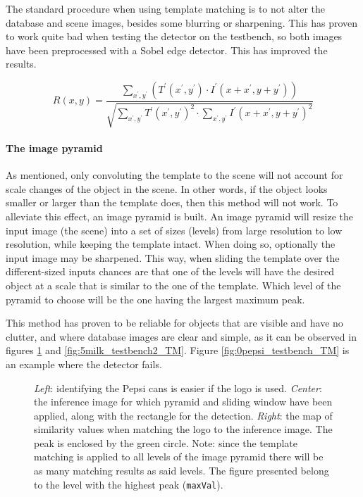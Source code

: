 \documentclass[../main.tex]{subfiles}
\begin{document}
The standard procedure when using template matching is to not alter the database and scene images, besides some blurring or sharpening. This has proven to work quite bad when testing the detector on the testbench, so both images have been preprocessed with a Sobel \cite{Sobel_operator_history} edge detector. This has improved the results.

\begin{equation} \label{eq:TM_CCOEFF_NORMED}
    R(x, y)=\frac{\sum_{x^{\prime}, y^{\prime}}\left(T^{\prime}\left(x^{\prime}, y^{\prime}\right) \cdot I^{\prime}\left(x+x^{\prime}, y+y^{\prime}\right)\right)}{\sqrt{\sum_{x^{\prime}, y^{\prime}} T^{\prime}\left(x^{\prime}, y^{\prime}\right)^{2} \cdot \sum_{x^{\prime}, y^{\prime}} I^{\prime}\left(x+x^{\prime}, y+y^{\prime}\right)^{2}}}
\end{equation}

\paragraph{The image pyramid}
As mentioned, only convoluting the template to the scene will not account for scale changes of the object in the scene. In other words, if the object looks smaller or larger than the template does, then this method will not work. To alleviate this effect, an image pyramid is built. An image pyramid will resize the input image (the scene) into a set of sizes (levels) from large resolution to low resolution, while keeping the template intact. When doing so, optionally the input image may be sharpened. This way, when sliding the template over the different-sized inputs chances are that one of the levels will have the desired object at a scale that is similar to the one of the template. Which level of the pyramid to choose will be the one having the largest maximum peak. 

This method has proven to be reliable for objects that are visible and have no clutter, and where database images are clear and simple, as it can be observed in figures \ref{fig:2pepsi_TM} and \ref{fig:5milk_testbench2_TM}. Figure \ref{fig:0pepsi_testbench_TM} is an example where the detector fails.


\begin{figure}[htbp]
    \centering
    \caption{\emph{Left}: identifying the Pepsi cans is easier if the logo is used. \emph{Center}: the inference image for which pyramid and sliding window have been applied, along with the rectangle for the detection. \emph{Right}: the map of similarity values when matching the logo to the inference image. The peak is enclosed by the green circle. Note: since the template matching is applied to all levels of the image pyramid there will be as many matching results as said levels. The figure presented belong to the level with the highest peak (\texttt{maxVal}).}
    \label{fig:2pepsi_TM}
\end{figure}
\end{document}
